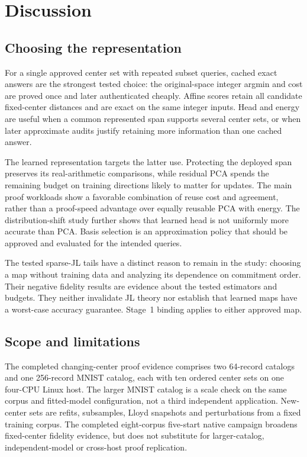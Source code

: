 \section{Discussion}\label{sec:discussion}
\subsection{Choosing the representation}
For a single approved center set with repeated subset queries, cached exact answers are the strongest tested choice: the original-space integer argmin and cost are proved once and later authenticated cheaply. Affine scores retain all candidate fixed-center distances and are exact on the same integer inputs. Head and energy are useful when a common represented span supports several center sets, or when later approximate audits justify retaining more information than one cached answer.

The learned representation targets the latter use. Protecting the deployed span preserves its real-arithmetic comparisons, while residual PCA spends the remaining budget on training directions likely to matter for updates. The main proof workloads show a favorable combination of reuse cost and agreement, rather than a proof-speed advantage over equally reusable PCA with energy. The distribution-shift study further shows that learned head is not uniformly more accurate than PCA. Basis selection is an approximation policy that should be approved and evaluated for the intended queries.

The tested sparse-JL tails have a distinct reason to remain in the study: choosing a map without training data and analyzing its dependence on commitment order. Their negative fidelity results are evidence about the tested estimators and budgets. They neither invalidate JL theory nor establish that learned maps have a worst-case accuracy guarantee. Stage~1 binding applies to either approved map.

\subsection{Scope and limitations}
The completed changing-center proof evidence comprises two 64-record catalogs and one 256-record MNIST catalog, each with ten ordered center sets on one four-CPU Linux host. The larger MNIST catalog is a scale check on the same corpus and fitted-model configuration, not a third independent application. New-center sets are refits, subsamples, Lloyd snapshots and perturbations from a fixed training corpus. The completed eight-corpus five-start native campaign broadens fixed-center fidelity evidence, but does not substitute for larger-catalog, independent-model or cross-host proof replication.

